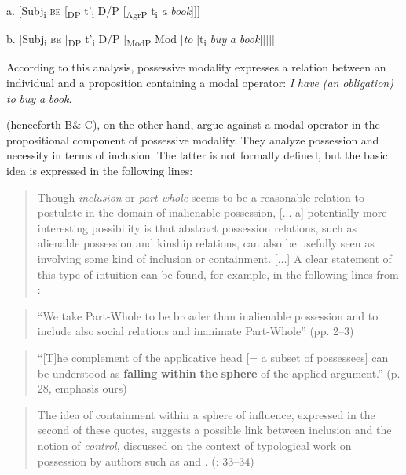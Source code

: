 \documentclass[output=paper,modfonts,nonflat]{langsci/langscibook}
\begin{document}
\ea%
    \label{ex:key:2}
    \gll\\
        \\
    \glt
    \z

          a.  [Subj\textsubscript{i} \textsc{be} [\textsubscript{DP} t'\textsubscript{i} D/P [\textsubscript{AgrP} t\textsubscript{i} \textit{a} \textit{book}]]]

  b.  [Subj\textsubscript{i} \textsc{be} [\textsubscript{DP} t'\textsubscript{i} D/P [\textsubscript{ModP} Mod [\textit{to} [t\textsubscript{i} \textit{buy} \textit{a} \textit{book}]]]]]

According to this analysis, possessive modality expresses a relation between an individual and a proposition containing a modal operator: \textit{I} \textit{have} \textit{(an} \textit{obligation)} \textit{to} \textit{buy} \textit{a} \textit{book}. 

\citet{BjorkmanCowper2016} (henceforth B\& C), on the other hand, argue against a modal operator in the propositional component of possessive modality. They analyze possession and necessity in terms of inclusion. The latter is not formally defined, but the basic idea is expressed in the following lines:

\begin{quote}
Though \textit{inclusion} or \textit{part-whole} seems to be a reasonable relation to postulate in the domain of inalienable possession, [... a] potentially more interesting possibility is that abstract possession relations, such as alienable possession and kinship relations, can also be usefully seen as involving some kind of inclusion or containment. [...] A clear statement of this type of intuition can be found, for example, in the following lines from \citet{BonehSichel2010}: 
\end{quote}

\begin{quote}
“We take Part-Whole to be broader than inalienable possession and to include also social relations and inanimate Part-Whole” (pp. 2–3) 
\end{quote}

\begin{quote}
“[T]he complement of the applicative head [= a subset of possessees] can be understood as \textbf{falling} \textbf{within} \textbf{the} \textbf{sphere} of the applied argument.” (p. 28, emphasis ours) 
\end{quote}

\begin{quote}
The idea of containment within a sphere of influence, expressed in the second of these quotes, suggests a possible link between inclusion and the notion of \textit{control}, discussed on the context of typological work on possession by authors such as \citet{Heine1997} and \citet{Stassen2009}. (\citealt{BjorkmanCowper2016}: 33–34)   
\end{quote}
\end{document}
